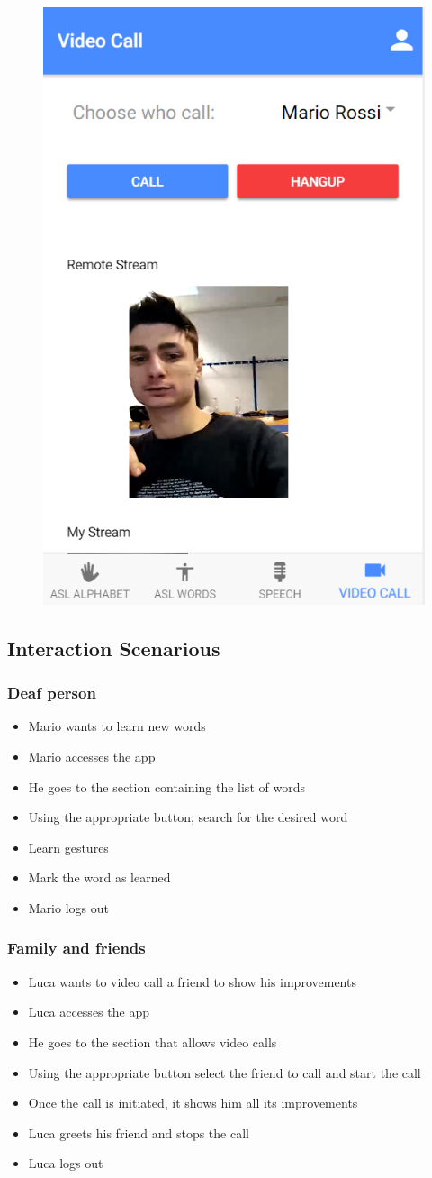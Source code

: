 \begin{figure}[h]
	\includegraphics[width=0.25\linewidth]{Figure/screenshot005}
\end{figure}


\subsection{Interaction Scenarious}
\subsubsection{Deaf person}
\begin{itemize}
	\item Mario wants to learn new words
	\item Mario accesses the app
	\item He goes to the section containing the list of words
	\item Using the appropriate button, search for the desired word
	\item Learn gestures
	\item Mark the word as learned
	\item Mario logs out
\end{itemize}
\subsubsection{Family and friends}
\begin{itemize}
	\item Luca wants to video call a friend to show his improvements
	\item Luca accesses the app
	\item He goes to the section that allows video calls
	\item Using the appropriate button select the friend to call and start the call
	\item Once the call is initiated, it shows him all its improvements
	\item Luca greets his friend and stops the call
	\item Luca logs out
\end{itemize}

